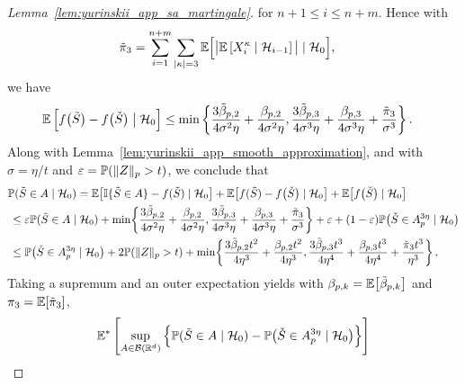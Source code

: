 \begin{proof}[Lemma~\ref{lem:yurinskii_app_sa_martingale}]
  for $n+1 \leq i \leq n+m$.
  Hence with
  \begin{align*}
    \tilde \pi_3
    &=
    \sum_{i=1}^{n+m}
    \sum_{|\kappa| = 3}
    \E \Big[ \big|
      \E \left[ X_i^\kappa \mid \cH_{i-1} \right]
    \big| \mid \cH_0 \Big],
  \end{align*}
  we have
  \begin{align*}
    \E\left[
      f\big(\tilde S\big) - f\big(\check S\big)
      \bigm| \cH_0
    \right]
    &\leq
    \min \left\{
      \frac{3 \tilde \beta_{p,2}}{4 \sigma^2 \eta}
      + \frac{\beta_{p,2}}{4 \sigma^2 \eta},
      \frac{3 \tilde \beta_{p,3}}{4 \sigma^3 \eta}
      + \frac{\beta_{p,3}}{4 \sigma^3 \eta}
      + \frac{\tilde \pi_3}{\sigma^3}
    \right\}.
  \end{align*}
  Along with Lemma~\ref{lem:yurinskii_app_smooth_approximation}, and with
  $\sigma = \eta / t$ and $\varepsilon = \P(\|Z\|_p > t)$,
  we conclude that
  \begin{align*}
    &\P(\tilde S \in A \mid \cH_0)
    =
    \E\big[\I\{\tilde S \in A\} - f(\tilde S)
      \mid \cH_0
    \big]
    + \E\big[f(\tilde S) - f\big(\check S\big)
      \mid \cH_0
    \big]
    + \E \big[f\big(\check S\big)
      \mid \cH_0
    \big] \\
    &\,\leq
    \varepsilon\P(\tilde S \in A
    \mid \cH_0)
    + \min \! \left\{
      \frac{3 \tilde \beta_{p,2}}{4 \sigma^2 \eta}
      + \frac{\beta_{p,2}}{4 \sigma^2 \eta},
      \frac{3 \tilde \beta_{p,3}}{4 \sigma^3 \eta}
      + \frac{\beta_{p,3}}{4 \sigma^3 \eta}
      + \frac{\tilde \pi_3}{\sigma^3}
    \right\}
    +
    \varepsilon
    + (1 - \varepsilon) \P\big(\check S \in A_p^{3\eta}
      \mid \cH_0
    \big) \\
    &\,\leq
    \P\big( \check S \in A_p^{3\eta}
      \mid \cH_0
    \big)
    + 2 \P(\|Z\|_p > t)
    + \min\!\left\{
      \frac{3 \tilde \beta_{p,2} t^2}{4 \eta^3}
      + \frac{\beta_{p,2} t^2}{4 \eta^3},
      \frac{3 \tilde \beta_{p,3} t^3}{4 \eta^4}
      + \frac{\beta_{p,3} t^3}{4 \eta^4}
      + \frac{\tilde \pi_3 t^3}{\eta^3}
    \right\}.
  \end{align*}
  Taking a supremum and an outer expectation yields
  with $\beta_{p,k} = \E\big[\tilde \beta_{p,k}\big]$
  and $\pi_3 = \E[\tilde \pi_3]$,
  \begin{align*}
    &\E^* \left[
      \sup_{A \in \cB(\R^d)}
      \left\{
        \P(\tilde S \in A \mid \cH_0)
        - \P\big( \check S \in A_p^{3\eta} \mid \cH_0 \big)
      \right\}
    \right] \\

\end{align*}
\end{proof}
